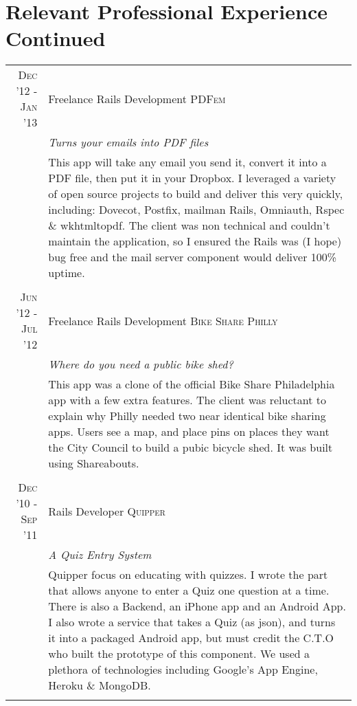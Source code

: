 \documentclass[a4paper,11pt]{article}
\begin{document}
\section{Relevant Professional Experience Continued}
\begin{tabular}{r|p{11.2cm}}
  \textsc{Dec '12 - Jan '13} & Freelance Rails Development \textsc{PDFem} \\
                             &\emph{Turns your emails into PDF files}\\
                             &\footnotesize{This app will take any email you send it, convert it into a PDF
  file, then put it in your Dropbox. I leveraged a variety of open source projects to build and
  deliver this very quickly, including: Dovecot, Postfix, mailman Rails, Omniauth, Rspec \&
  wkhtmltopdf. The client was non technical and couldn't maintain the application, so I ensured the
  Rails was (I hope) bug free and the mail server component would deliver 100\% uptime.}
  \\\multicolumn{2}{c}{} \\
  \textsc{Jun '12 - Jul '12} & Freelance Rails Development \textsc{Bike Share Philly} \\
                             &\emph{Where do you need a public bike shed?}\\
                             &\footnotesize{This app was a clone of the official Bike Share Philadelphia
  app with a few extra features. The client was reluctant to explain why Philly needed two near
  identical bike sharing apps. Users see a map, and place pins on places they want the City
  Council to build a pubic bicycle shed. It was built using Shareabouts.}
  \\\multicolumn{2}{c}{} \\
  \textsc{Dec '10 - Sep '11} & Rails Developer \textsc{Quipper} \\
                             &\emph{A Quiz Entry System}\\
                             &\footnotesize{Quipper focus on educating with quizzes. I wrote the
  part that allows anyone to enter a Quiz one question at a time. There is also a Backend, an
  iPhone app and an Android App. I also wrote a service that takes a Quiz (as json), and turns it into
  a packaged Android app, but must credit the C.T.O who built the prototype of this component. We
  used a plethora of technologies including Google's App Engine, Heroku \& MongoDB.}
  \\\multicolumn{2}{c}{} \\

\end{tabular}
\end{document}

